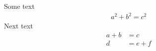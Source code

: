 Some text
\begin{align*}
  a^2 + b^2 = c^2
\end{align*}
Next text
\begin{align*}
  a + b &= c\\
  d &= e + f
\end{align*}

